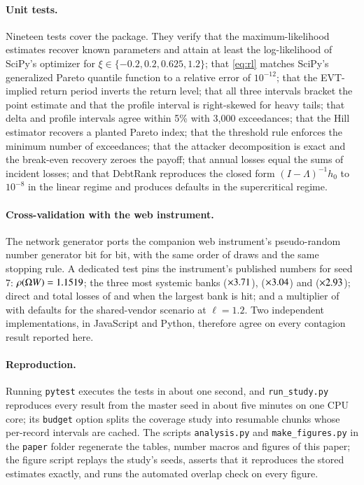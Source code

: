 \paragraph{Unit tests.} Nineteen tests cover the package. They verify that the maximum-likelihood estimates recover known parameters and attain at least the log-likelihood of SciPy's optimizer for $\xi \in \{-0.2, 0.2, 0.625, 1.2\}$; that \cref{eq:rl} matches SciPy's generalized Pareto quantile function to a relative error of $10^{-12}$; that the EVT-implied return period inverts the return level; that all three intervals bracket the point estimate and that the profile interval is right-skewed for heavy tails; that delta and profile intervals agree within 5\% with 3{,}000 exceedances; that the Hill estimator recovers a planted Pareto index; that the threshold rule enforces the minimum number of exceedances; that the attacker decomposition is exact and the break-even recovery zeroes the payoff; that annual losses equal the sums of incident losses; and that DebtRank reproduces the closed form $(I-\Lambda)^{-1}h_0$ to $10^{-8}$ in the linear regime and produces defaults in the supercritical regime.

\paragraph{Cross-validation with the web instrument.} The network generator ports the companion web instrument's pseudo-random number generator bit for bit, with the same order of draws and the same stopping rule. A dedicated test pins the instrument's published numbers for seed 7: $\rho(\Omega W) = 1.1519$; the three most systemic banks \topOneName{} ($\times3.71$), \topTwoName{} ($\times3.04$) and \topThreeName{} ($\times2.93$); direct and total losses of \scBigDirect{} and \scBigTotal{} when the largest bank is hit; and a multiplier of \scVendHighMult{} with \scVendHighDef{} defaults for the shared-vendor scenario at $\ell = 1.2$. Two independent implementations, in JavaScript and Python, therefore agree on every contagion result reported here.

\paragraph{Reproduction.} Running \texttt{pytest} executes the tests in about one second, and \texttt{run\_study.py} reproduces every result from the master seed in about five minutes on one CPU core; its \texttt{budget} option splits the coverage study into resumable chunks whose per-record intervals are cached. The scripts \texttt{analysis.py} and \texttt{make\_figures.py} in the \texttt{paper} folder regenerate the tables, number macros and figures of this paper; the figure script replays the study's seeds, asserts that it reproduces the stored estimates exactly, and runs the automated overlap check on every figure.
